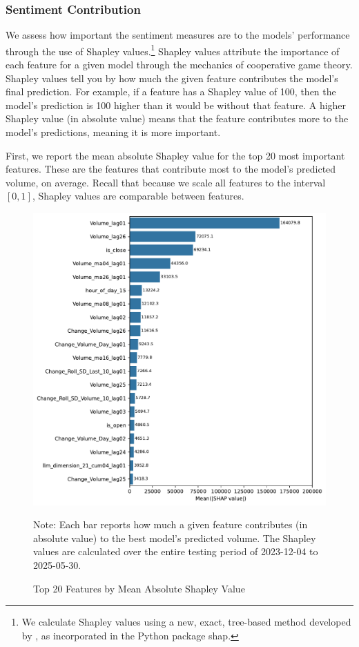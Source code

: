\documentclass[12pt]{article}
\begin{document}
\subsubsection{Sentiment Contribution}
We assess how important the sentiment measures are to the models' performance through the use of Shapley values.\footnote{We calculate Shapley values using a new, exact, tree-based method developed by \textcite{lundberg2020local2global}, as incorporated in the Python package \textsf{shap}.} Shapley values attribute the importance of each feature for a given model through the mechanics of cooperative game theory. Shapley values tell you by how much the given feature contributes the model's final prediction. For example, if a feature has a Shapley value of 100, then the model's prediction is 100 higher than it would be without that feature. A higher Shapley value (in absolute value) means that the feature contributes more to the model's predictions, meaning it is more important.

First, we report the mean absolute Shapley value for the top 20 most important features. These are the features that contribute most to the model's predicted volume, on average. Recall that because we scale all features to the interval $[0,1]$, Shapley values are comparable between features.
\begin{figure}[H]
    \centering
    \caption{Top 20 Features by Mean Absolute Shapley Value}
    \includegraphics[width=0.75\linewidth]{../Output/shap_abs_all.pdf}
    \begin{minipage}{0.75\linewidth}
        \footnotesize
        \singlespacing
        Note: Each bar reports how much a given feature contributes (in absolute value) to the best model's predicted volume. The Shapley values are calculated over the entire testing period of 2023-12-04 to 2025-05-30.
    \end{minipage}
    \label{fig:shapley_overall}
\end{figure}
\end{document}
